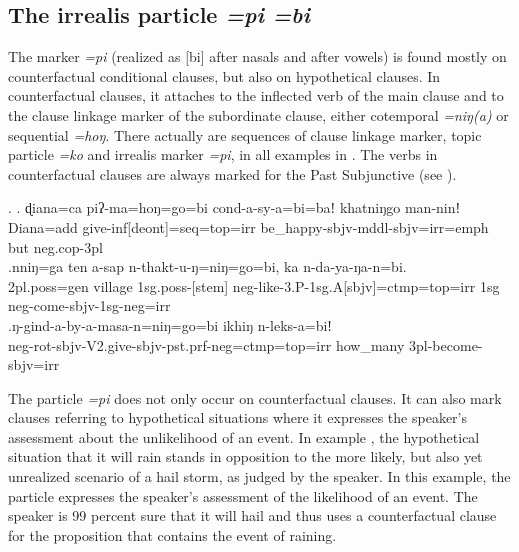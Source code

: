 \subsection{The irrealis particle \emph{=pi \ti =bi}}

The marker \emph{=pi} (realized as [bi] after nasals and after vowels) is  found mostly on counterfactual conditional clauses, but also on hypothetical clauses. In counterfactual clauses, it attaches to the inflected verb of the main clause and to the clause linkage marker of the subordinate clause, either cotemporal \emph{=niŋ(a)} or sequential  \emph{=hoŋ}.  There  actually are sequences of clause linkage marker, topic particle \emph{=ko} and irrealis marker \emph{=pi}, in all examples in \Next. The verbs in counterfactual clauses are always marked for the Past Subjunctive (see ).
	
	\ex. \ag. ɖiana=ca  piʔ-ma=hoŋ=go=bi   cond-a-sy-a=bi=baǃ khatniŋgo man-ninǃ\\
	Diana{\sc =add} give{\sc -inf[deont]=seq=top=irr} be\_happy{\sc [3sg]-sbjv-mddl-sbjv=irr=emph} but {\sc neg.cop-3pl}\\
	\bg.nniŋ=ga ten a-sap n-thakt-u-ŋ=niŋ=go=bi, ka n-da-ya-ŋa-n=bi.\\
	{\sc 2pl.poss=gen} village {\sc 1sg.poss-[stem]} {\sc neg-}like{\sc -3.P-1sg.A[sbjv]=ctmp=top=irr} {\sc 1sg} {\sc neg-}come{\sc -sbjv-1sg-neg=irr}\\
	\bg.ŋ-gind-a-by-a-masa-n=niŋ=go=bi ikhiŋ n-leks-a=biǃ\\
	{\sc neg-}rot{\sc -sbjv-V2.give-sbjv-pst.prf-neg=ctmp=top=irr} how\_many {\sc 3pl-}become{\sc -sbjv=irr}\\
	 
	
The particle \emph{=pi} does not only occur on counterfactual clauses. It can also mark clauses referring to hypothetical situations where it expresses the speaker's assessment about the unlikelihood of an event. In example \Next, the hypothetical situation that it will rain stands in opposition to the more likely, but also yet unrealized scenario of a hail storm, as judged by the speaker. In this example, the particle expresses the speaker's assessment of the likelihood of an event. The speaker is 99 percent sure that it will hail and thus uses a  counterfactual clause for  the proposition that contains the event of raining. 


